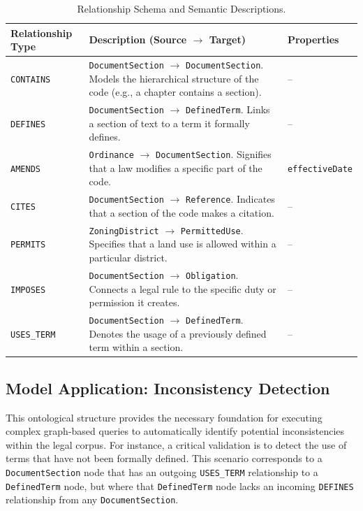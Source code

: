 \begin{table}[htbp]
\centering
{}
\begin{tabularx}{\textwidth}{@{} >{\raggedright}p{} >{\raggedright}X L{0.15\textwidth} @{}}
\toprule
\textbf{Relationship Type} & \textbf{Description (Source \(\rightarrow\) Target)} & \textbf{Properties} \\
\midrule
\texttt{CONTAINS} & \texttt{DocumentSection} \(\rightarrow\) \texttt{DocumentSection}. Models the hierarchical structure of the code (e.g., a chapter contains a section). & -- \\
\addlinespace
\texttt{DEFINES} & \texttt{DocumentSection} \(\rightarrow\) \texttt{DefinedTerm}. Links a section of text to a term it formally defines. & -- \\
\addlinespace
\texttt{AMENDS} & \texttt{Ordinance} \(\rightarrow\) \texttt{DocumentSection}. Signifies that a law modifies a specific part of the code. & \texttt{effectiveDate} \\
\addlinespace
\texttt{CITES} & \texttt{DocumentSection} \(\rightarrow\) \texttt{Reference}. Indicates that a section of the code makes a citation. & -- \\
\addlinespace
\texttt{PERMITS} & \texttt{ZoningDistrict} \(\rightarrow\) \texttt{PermittedUse}. Specifies that a land use is allowed within a particular district. & -- \\
\addlinespace
\texttt{IMPOSES} & \texttt{DocumentSection} \(\rightarrow\) \texttt{Obligation}. Connects a legal rule to the specific duty or permission it creates. & -- \\
\addlinespace
\texttt{USES\_TERM} & \texttt{DocumentSection} \(\rightarrow\) \texttt{DefinedTerm}. Denotes the usage of a previously defined term within a section. & -- \\
\bottomrule
\end{tabularx}
\caption{Relationship Schema and Semantic Descriptions.}
\label{tab:relationship_schema}
\end{table}

\subsection{Model Application: Inconsistency Detection}
This ontological structure provides the necessary foundation for executing complex graph-based queries to automatically identify potential inconsistencies within the legal corpus. For instance, a critical validation is to detect the use of terms that have not been formally defined. This scenario corresponds to a \texttt{DocumentSection} node that has an outgoing \texttt{USES\_TERM} relationship to a \texttt{DefinedTerm} node, but where that \texttt{DefinedTerm} node lacks an incoming \texttt{DEFINES} relationship from any \texttt{DocumentSection}.

